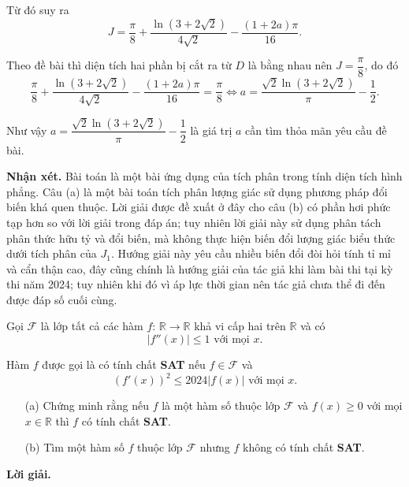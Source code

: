 \begin{enumerate}
{    Từ đó suy ra $$J = \dfrac{\pi}{8} + \dfrac{\ln(3 + 2\sqrt{2})}{4\sqrt{2}} - \dfrac{(1+2a)\pi}{16}.$$

    Theo đề bài thì diện tích hai phần bị cắt ra từ $D$ là bằng nhau nên $J = \dfrac{\pi}{8}$, do đó $$\dfrac{\pi}{8} + \dfrac{\ln(3 + 2\sqrt{2})}{4\sqrt{2}} - \dfrac{(1+2a)\pi}{16} = \dfrac{\pi}{8} \iff a = \dfrac{\sqrt{2}\ln(3+2\sqrt{2})}{\pi} - \dfrac{1}{2}.$$

    Như vậy $a = \dfrac{\sqrt{2}\ln(3+2\sqrt{2})}{\pi} - \dfrac{1}{2}$ là giá trị $a$ cần tìm thỏa mãn yêu cầu đề bài.}
\end{enumerate}

\textbf{Nhận xét. }Bài toán là một bài ứng dụng của tích phân trong tính diện tích hình phẳng. Câu (a) là một bài toán tích phân lượng giác sử dụng phương pháp đổi biến khá quen thuộc. Lời giải được đề xuất ở đây cho câu (b) có phần hơi phức tạp hơn so với lời giải trong đáp án; tuy nhiên lời giải này sử dụng phân tách phân thức hữu tỷ và đổi biến, mà không thực hiện biến đổi lượng giác biểu thức dưới tích phân của $J_1$. Hướng giải này yêu cầu nhiều biến đổi đòi hỏi tính tỉ mỉ và cẩn thận cao, đây cũng chính là hướng giải của tác giả khi làm bài thi tại kỳ thi năm 2024; tuy nhiên khi đó vì áp lực thời gian nên tác giả chưa thể đi đến được đáp số cuối cùng.

\begin{tcolorbox}[title=\textbf{Bài toán A.4.},breakable]
    Gọi $\mathcal{F}$ là lớp tất cả các hàm $f:\,\mathbb{R}\to \mathbb{R}$ khả vi cấp hai trên $\mathbb{R}$ và có $$|f''(x)| \leq 1 \text{ với mọi }x.$$

    Hàm $f$ được gọi là có tính chất \textbf{SAT} nếu $f \in \mathcal{F}$ và $$(f'(x))^2 \leq 2024|f(x)|\text{ với mọi }x.$$

    \begin{enumerate}
        \item[(a)] {Chứng minh rằng nếu $f$ là một hàm số thuộc lớp $\mathcal{F}$ và $f(x) \geq 0$ với mọi $x \in \mathbb{R}$ thì $f$ có tính chất \textbf{SAT}.}
        \item[(b)] {Tìm một hàm số $f$ thuộc lớp $\mathcal{F}$ nhưng $f$ không có tính chất \textbf{SAT}.}  
    \end{enumerate}
\end{tcolorbox}

\textbf{Lời giải. }

